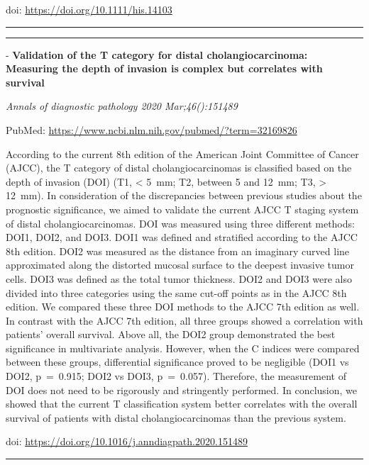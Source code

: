 \documentclass[
]{article}
\begin{document}
doi: \url{https://doi.org/10.1111/his.14103}

\begin{center}\rule{0.5\linewidth}{0.5pt}\end{center}

\begin{center}\rule{0.5\linewidth}{0.5pt}\end{center}

- \textbf{Validation of the T category for distal cholangiocarcinoma:
Measuring the depth of invasion is complex but correlates with survival}

\emph{Annals of diagnostic pathology 2020 Mar;46():151489}

PubMed: \url{https://www.ncbi.nlm.nih.gov/pubmed/?term=32169826}

According to the current 8th edition of the American Joint Committee of
Cancer (AJCC), the T category of distal cholangiocarcinomas is
classified based on the depth of invasion (DOI) (T1, \textless{} 5~mm;
T2, between 5 and 12~mm; T3, \textgreater{} 12~mm). In consideration of
the discrepancies between previous studies about the prognostic
significance, we aimed to validate the current AJCC T staging system of
distal cholangiocarcinomas. DOI was measured using three different
methods: DOI1, DOI2, and DOI3. DOI1 was defined and stratified according
to the AJCC 8th edition. DOI2 was measured as the distance from an
imaginary curved line approximated along the distorted mucosal surface
to the deepest invasive tumor cells. DOI3 was defined as the total tumor
thickness. DOI2 and DOI3 were also divided into three categories using
the same cut-off points as in the AJCC 8th edition. We compared these
three DOI methods to the AJCC 7th edition as well. In contrast with the
AJCC 7th edition, all three groups showed a correlation with patients'
overall survival. Above all, the DOI2 group demonstrated the best
significance in multivariate analysis. However, when the C indices were
compared between these groups, differential significance proved to be
negligible (DOI1 vs DOI2, p~=~0.915; DOI2 vs DOI3, p~=~0.057).
Therefore, the measurement of DOI does not need to be rigorously and
stringently performed. In conclusion, we showed that the current T
classification system better correlates with the overall survival of
patients with distal cholangiocarcinomas than the previous system.

doi: \url{https://doi.org/10.1016/j.anndiagpath.2020.151489}

\begin{center}\rule{0.5\linewidth}{0.5pt}\end{center}
\end{document}
